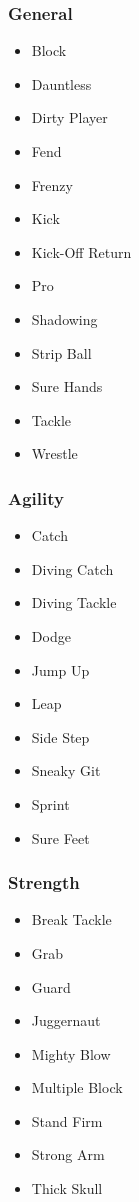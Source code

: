 \documentclass{article}
\begin{document}
\begin{multicols}{3}

\begin{samepage}
\subsubsection{General}
\begin{itemize}
\item[] Block
\item[] Dauntless
\item[] Dirty Player
\item[] Fend
\item[] Frenzy
\item[] Kick
\item[] Kick-Off Return
\item[] Pro
\item[] Shadowing
\item[] Strip Ball
\item[] Sure Hands
\item[] Tackle
\item[] Wrestle
\end{itemize}
\end{samepage}

\begin{samepage}
\subsubsection{Agility}
\begin{itemize}
\item[] Catch
\item[] Diving Catch
\item[] Diving Tackle
\item[] Dodge
\item[] Jump Up
\item[] Leap
\item[] Side Step
\item[] Sneaky Git
\item[] Sprint
\item[] Sure Feet
\end{itemize}
\end{samepage}

\columnbreak

\begin{samepage}
\subsubsection{Strength}
\begin{itemize}
\item[] Break Tackle
\item[] Grab
\item[] Guard
\item[] Juggernaut
\item[] Mighty Blow
\item[] Multiple Block
\item[] Stand Firm
\item[] Strong Arm
\item[] Thick Skull
\end{itemize}
\end{samepage}


\end{multicols}
\end{document}
